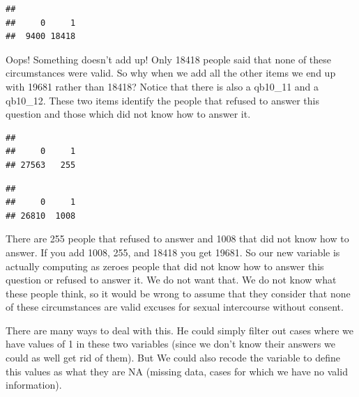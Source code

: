 \documentclass[
]{book}
\newenvironment{Shaded}{\begin{snugshade}}{\end{snugshade}}
\newcommand{\FunctionTok}[1]{\textcolor[rgb]{0.00,0.00,0.00}{#1}}
\newcommand{\NormalTok}[1]{#1}
\newcommand{\SpecialCharTok}[1]{\textcolor[rgb]{0.00,0.00,0.00}{#1}}
\begin{document}
\begin{Shaded}
\end{Shaded}

\begin{verbatim}
## 
##     0     1 
##  9400 18418
\end{verbatim}

Oops! Something doesn't add up! Only 18418 people said that none of these circumstances were valid. So why when we add all the other items we end up with 19681 rather than 18418? Notice that there is also a qb10\_11 and a qb10\_12. These two items identify the people that refused to answer this question and those which did not know how to answer it.

\begin{Shaded}
\end{Shaded}

\begin{verbatim}
## 
##     0     1 
## 27563   255
\end{verbatim}

\begin{Shaded}
\end{Shaded}

\begin{verbatim}
## 
##     0     1 
## 26810  1008
\end{verbatim}

There are 255 people that refused to answer and 1008 that did not know how to answer. If you add 1008, 255, and 18418 you get 19681. So our new variable is actually computing as zeroes people that did not know how to answer this question or refused to answer it. We do not want that. We do not know what these people think, so it would be wrong to assume that they consider that none of these circumstances are valid excuses for sexual intercourse without consent.

There are many ways to deal with this. He could simply filter out cases where we have values of 1 in these two variables (since we don't know their answers we could as well get rid of them). But We could also recode the variable to define this values as what they are NA (missing data, cases for which we have no valid information).
\end{document}
